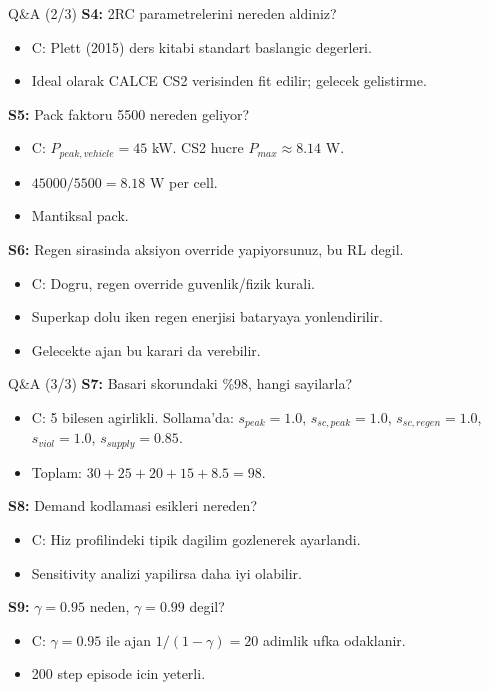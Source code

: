 \documentclass[10pt,aspectratio=169]{beamer}
\begin{document}
\begin{frame}{Q\&A (2/3)}
\textbf{S4:} 2RC parametrelerini nereden aldiniz?
\begin{itemize}\footnotesize
  \item C: Plett (2015) ders kitabi standart baslangic degerleri.
  \item Ideal olarak CALCE CS2 verisinden fit edilir; gelecek gelistirme.
\end{itemize}

\textbf{S5:} Pack faktoru 5500 nereden geliyor?
\begin{itemize}\footnotesize
  \item C: $P_{peak,vehicle} = 45$ kW. CS2 hucre $P_{max} \approx 8.14$ W.
  \item $45000/5500 = 8.18$ W per cell.
  \item Mantiksal pack.
\end{itemize}

\textbf{S6:} Regen sirasinda aksiyon override yapiyorsunuz, bu RL degil.
\begin{itemize}\footnotesize
  \item C: Dogru, regen override guvenlik/fizik kurali.
  \item Superkap dolu iken regen enerjisi bataryaya yonlendirilir.
  \item Gelecekte ajan bu karari da verebilir.
\end{itemize}
\end{frame}

\begin{frame}{Q\&A (3/3)}
\textbf{S7:} Basari skorundaki \%98, hangi sayilarla?
\begin{itemize}\footnotesize
  \item C: 5 bilesen agirlikli. Sollama'da: $s_{peak}=1.0$, $s_{sc,peak}=1.0$, $s_{sc,regen}=1.0$, $s_{viol}=1.0$, $s_{supply}=0.85$.
  \item Toplam: $30+25+20+15+8.5 = 98$.
\end{itemize}

\textbf{S8:} Demand kodlamasi esikleri nereden?
\begin{itemize}\footnotesize
  \item C: Hiz profilindeki tipik dagilim gozlenerek ayarlandi.
  \item Sensitivity analizi yapilirsa daha iyi olabilir.
\end{itemize}

\textbf{S9:} $\gamma=0.95$ neden, $\gamma=0.99$ degil?
\begin{itemize}\footnotesize
  \item C: $\gamma=0.95$ ile ajan $1/(1-\gamma) = 20$ adimlik ufka odaklanir.
  \item 200 step episode icin yeterli.
\end{itemize}
\end{frame}
\end{document}
